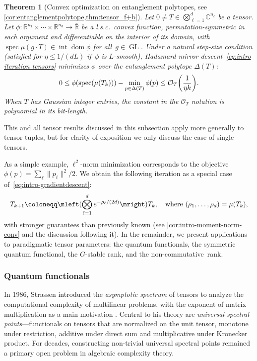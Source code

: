 \documentclass[11pt,letterpaper]{article}
\newtheorem{theorem}{Theorem}[section]
\numberwithin{equation}{section}
\newcommand{\RR}{\mathbb{R}}
\newcommand{\CC}{\mathbb{C}}
\DeclareMathOperator{\intr}{int}
\DeclareMathOperator{\dom}{dom}
\DeclareMathOperator{\spec}{spec}
\DeclareMathOperator{\GL}{GL}
\begin{document}
\begin{theorem}[Convex optimization on entanglement polytopes, see \cref{cor:entanglementpolytope,thm:tensor_f+b}]\label{thm:intro ent po}
    Let $0\neq T\in \bigotimes_{\ell=1}^d \CC^{n_\ell}$ be a tensor.
    Let $\phi \colon \RR^{n_1}\times\cdots\times\RR^{n_d}\to\overline{\RR}$ be a l.s.c.\ convex function, permutation-symmetric in each argument and differentiable on the interior of its domain, with $\spec\mu(g \cdot T) \in\intr\dom\phi$ for all~$g \in \GL$.
    Under a natural step-size condition (satisfied for $\eta\leq1/(dL)$ if~$\phi$ is $L$-smooth), Hadamard mirror descent~\eqref{eq:intro iteration tensors} minimizes $\phi$ over the entanglement polytope $\Delta(T)$:
    \[
    0 \leq \phi(\spec(\mu(T_k))) - \min_{p \in \Delta(T)}\phi(p) \leq \mathcal O_T\mleft( \frac1{\eta k} \mright).
    \]
    When $T$ has Gaussian integer entries, the constant in the $\mathcal O_T$ notation is polynomial in its bit-length.
\end{theorem}

\noindent
This and all tensor results discussed in this subsection apply more generally to tensor tuples, but for clarity of exposition we only discuss the case of single tensors.

As a simple example, $\ell^2$-norm minimization corresponds to the objective $\phi(p) = \sum_{\ell}\|p_\ell\|^2/2$.
We obtain the following iteration as a special case of~\eqref{eq:intro-gradientdescent}:
\begin{equation}\label{eq:tensor grad descent}
    T_{k+1} \coloneqq \mleft(\bigotimes_{\ell = 1}^de^{-\rho_\ell/(2d)}\mright) T_k,\quad \text{where}\ (\rho_1, \ldots, \rho_d) = \mu(T_k),
\end{equation}
with stronger guarantees than previously known (see \cref{cor:intro-moment-norm-conv} and the discussion following it).
In the remainder, we present applications to paradigmatic tensor parameters:
the quantum functionals, the symmetric quantum functional, the $G$-stable rank, and the non-commutative~rank.


\subsubsection{Quantum functionals}\label{ssub:quantum_functionals}
In 1986, Strassen introduced the \emph{asymptotic spectrum} of tensors to analyze the computational complexity of multilinear problems, with the exponent of matrix multiplication as a main motivation \cite{Strassen-86,Strassen-88,Strassen-05}.
Central to his theory are \emph{universal spectral points}---functionals on tensors that are normalized on the unit tensor, monotone under restriction, additive under direct sum and multiplicative under Kronecker product.
For decades, constructing non-trivial universal spectral points remained a primary open problem in algebraic complexity theory.
\end{document}
